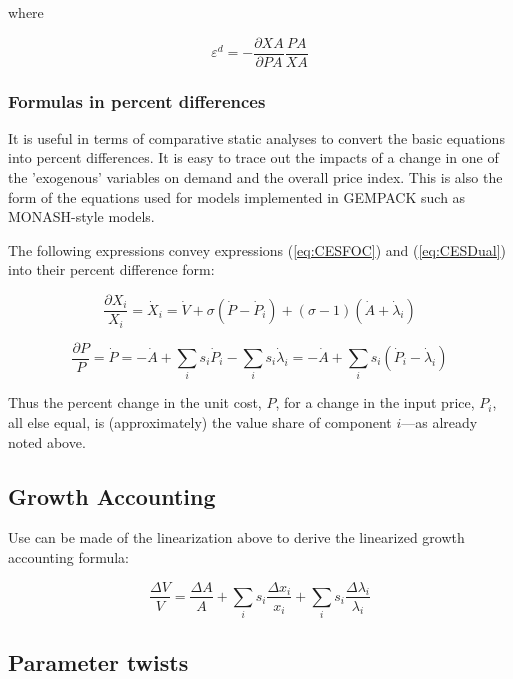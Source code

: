 \noindent where

\[
\varepsilon^d = -\frac{\partial \mathit{XA}}{\partial \mathit{PA}}
\frac{\mathit{PA}}{\mathit{XA}}
\]

\subsubsection{Formulas in percent differences}
It is useful in terms of comparative static analyses to convert the basic equations into percent differences.
It is easy to trace out the impacts of a change in one of the 'exogenous' variables on demand and the overall
price index. This is also the form of the equations used for models implemented in GEMPACK such as MONASH-style
models.

The following expressions convey expressions (\ref{eq:CESFOC}) and (\ref{eq:CESDual}) into their percent
difference form:

\begin{displaymath}
\frac{\partial X_i}{X_i} = \dot{X}_i = \dot{V} + \sigma \left(\dot{P} - \dot{P}_i \right)
+ \left( \sigma - 1 \right) \left(\dot{A} + \dot{\lambda}_i \right)
\end{displaymath}

\begin{displaymath}
\frac{\partial P}{P} = \dot{P} = -\dot{A} + \sum_i{s_i \dot{P}_i} - \sum_i{s_i \dot{\lambda}_i}
= -\dot{A} + \sum_i{s_i \left(\dot{P}_i - \dot{\lambda}_i\right)}
\end{displaymath}

\noindent Thus the percent change in the unit cost, $P$, for a change in the input price, $P_i$, all else equal, is
(approximately) the value share of component $i$---as already noted above.

\subsection{Growth Accounting}

Use can be made of the linearization above to derive the linearized growth accounting
formula:

\begin{displaymath}
\frac{\Delta V}{V}=\frac{\Delta
A}{A}+\sum\limits_{i}{{{s}_{i}}\frac{\Delta
{{x}_{i}}}{{{x}_{i}}}}+\sum\limits_{i}{{{s}_{i}}\frac{\Delta {{\lambda
}_{i}}}{{{\lambda }_{i}}}}
\end{displaymath}


\subsection{Parameter twists}

